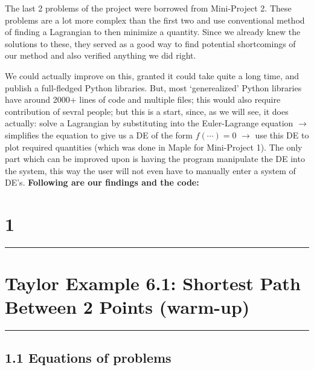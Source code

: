 \documentclass[hidelinks, 11pt]{article}
\begin{document}
The last 2 problems of the project were borrowed from Mini-Project 2. These problems are a lot more complex than the first two and use conventional method of finding a Lagrangian to then minimize a quantity. Since we already knew the solutions to these, they served as a good way to find potential shortcomings of our method and also verified anything we did right.

We could actually improve on this, granted it could take quite a long time, and publish a full-fledged Python libraries. But, most `generealized' Python libraries have around 2000+ lines of code and multiple files; this would also require contribution of sevral people; but this is a start, since, as we will see, it does actually: solve a Lagrangian by substituting into the Euler-Lagrange equation $\longrightarrow$ simplifies the equation to give us a DE of the form $f(\cdots) = 0$ $\longrightarrow$ use this DE to plot required quantities (which was done in Maple for Mini-Project 1). The only part which can be improved upon is having the program manipulate the DE into the system, this way the user will not even have to manually enter a system of DE's.
\newline
\noindent \textbf{Following are our findings and the code:}

\newpage

\begin{center}
  \section*{1}
  \noindent\rule{16cm}{0.4pt}
  \section*{Taylor Example 6.1: Shortest Path Between 2 Points (warm-up)} %
  \noindent\rule{16cm}{0.4pt}
\end{center}

\subsection*{1.1 Equations of problems}

\begin{center}
\end{center}
\end{document}

